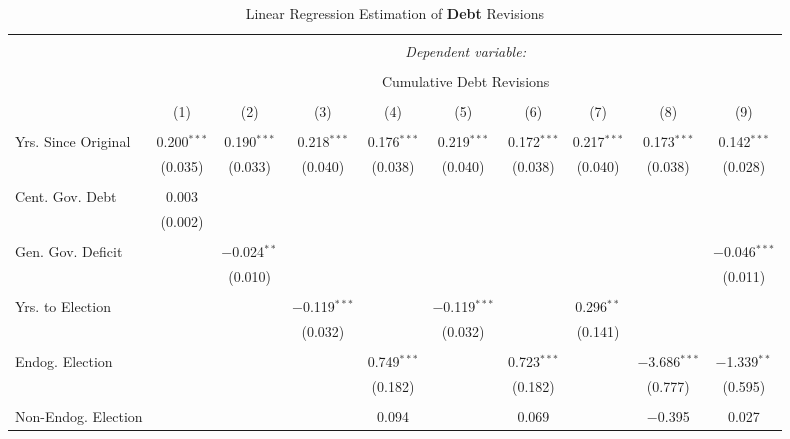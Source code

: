 
\begin{table}[!htbp] \centering 
  \caption{Linear Regression Estimation of \textbf{Debt} Revisions} 
  \label{debt_results} 
\tiny 
\begin{tabular}{@{\extracolsep{5pt}}lccccccccc} 
\\[-1.8ex]\hline 
\hline \\[-1.8ex] 
 & \multicolumn{9}{c}{\textit{Dependent variable:}} \\ 
\cline{2-10} 
\\[-1.8ex] & \multicolumn{9}{c}{Cumulative Debt Revisions} \\ 
\\[-1.8ex] & (1) & (2) & (3) & (4) & (5) & (6) & (7) & (8) & (9)\\ 
\hline \\[-1.8ex] 
 Yrs. Since Original & 0.200$^{***}$ & 0.190$^{***}$ & 0.218$^{***}$ & 0.176$^{***}$ & 0.219$^{***}$ & 0.172$^{***}$ & 0.217$^{***}$ & 0.173$^{***}$ & 0.142$^{***}$ \\ 
  & (0.035) & (0.033) & (0.040) & (0.038) & (0.040) & (0.038) & (0.040) & (0.038) & (0.028) \\ 
  & & & & & & & & & \\ 
 Cent. Gov. Debt & 0.003 &  &  &  &  &  &  &  &  \\ 
  & (0.002) &  &  &  &  &  &  &  &  \\ 
  & & & & & & & & & \\ 
 Gen. Gov. Deficit &  & $-$0.024$^{**}$ &  &  &  &  &  &  & $-$0.046$^{***}$ \\ 
  &  & (0.010) &  &  &  &  &  &  & (0.011) \\ 
  & & & & & & & & & \\ 
 Yrs. to Election &  &  & $-$0.119$^{***}$ &  & $-$0.119$^{***}$ &  & 0.296$^{**}$ &  &  \\ 
  &  &  & (0.032) &  & (0.032) &  & (0.141) &  &  \\ 
  & & & & & & & & & \\ 
 Endog. Election &  &  &  & 0.749$^{***}$ &  & 0.723$^{***}$ &  & $-$3.686$^{***}$ & $-$1.339$^{**}$ \\ 
  &  &  &  & (0.182) &  & (0.182) &  & (0.777) & (0.595) \\ 
  & & & & & & & & & \\ 
 Non-Endog. Election &  &  &  & 0.094 &  & 0.069 &  & $-$0.395 & 0.027 \\ 

\end{tabular}
\end{table}
